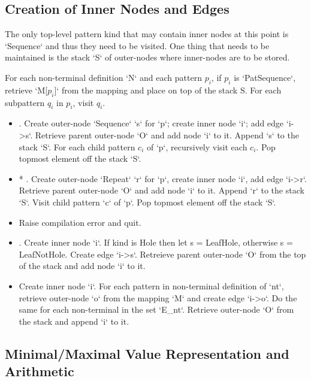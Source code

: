 \subsection{Creation of Inner Nodes and Edges}

The only top-level pattern kind that may contain inner nodes at this point is `Sequence` and thus they need to be visited. One thing that needs to be maintained is the stack `S` of outer-nodes where inner-nodes are to be stored.

For each non-terminal definition `N` and each pattern $p_i$, if $p_i$ is `PatSequence`, retrieve `M[$p_i$]` from the mapping and place on top of the stack S. For each subpattern $q_i$ in $p_i$, visit $q_i$.

\begin{itemize}
\item
\PatternSequence. Create outer-node `Sequence` `s` for `p`; create inner node `i`; add edge `i->s`. Retrieve parent outer-node `O` and add node `i` to it. Append `s` to the stack `S`. For each child pattern $c_i$ of `p`, recursively visit each $c_i$. Pop topmost element off the stack `S`.

\item
* \Repeat. Create outer-node `Repeat` `r` for `p`, create inner node `i`, add edge `i->r`. Retrieve parent outer-node `O` and add node `i` to it. Append `r` to the stack `S`. Visit child pattern `c` of `p`. Pop topmost element off the stack `S`.

\item
\InHolePattern Raise compilation error and quit.

\item
\BuiltInPattern. Create inner node `i`. If kind is Hole then let s = LeafHole, otherwise s = LeafNotHole. Create edge `i->s`.  Retreieve parent outer-node `O` from the top of the stack and add node `i` to it.

\item
\Nt Create inner node `i`. For each pattern in non-terminal definition of `nt`, retrieve outer-node `o` from the mapping `M` and create edge `i->o`. Do the same for each non-terminal in the set `E\_nt`. Retrieve outer-node `O` from the stack and append `i` to it.

\end{itemize}

\subsection{Minimal/Maximal Value Representation and Arithmetic}

